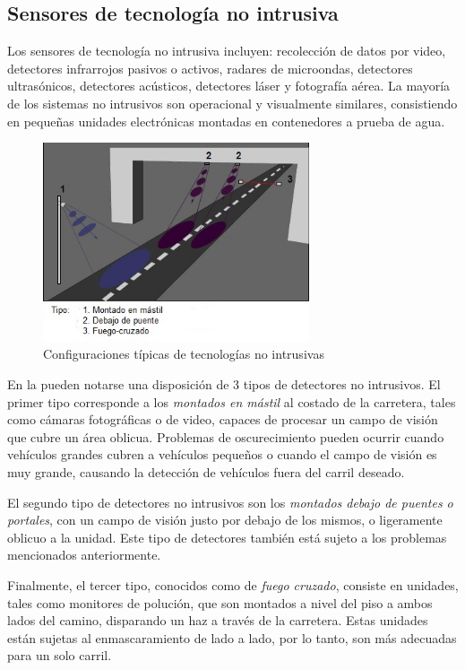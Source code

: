 \subsection{Sensores de tecnología no intrusiva}

Los sensores de tecnología no intrusiva incluyen:  recolección de datos por video, detectores infrarrojos pasivos o activos, radares de microondas, detectores ultrasónicos, detectores acústicos, detectores láser y fotografía aérea. La mayoría de los sistemas no intrusivos son operacional y visualmente similares, consistiendo en pequeñas unidades electrónicas montadas en contenedores a prueba de agua.

\begin{figure}[h]
	\centering
	\includegraphics[width=0.7\textwidth]{capitulos/3/figuras/figura3.jpg}
	\caption{\label{fig:noIntrusica}  Configuraciones típicas de tecnologías no intrusivas}	
\end{figure}

En la  pueden notarse una disposición de 3 tipos de detectores no intrusivos. El primer tipo corresponde a los \emph{montados en mástil} al costado de la carretera, tales como cámaras fotográficas o de video, capaces de procesar un campo de visión que cubre un área oblicua.  Problemas de oscurecimiento pueden ocurrir cuando vehículos grandes cubren a vehículos pequeños o cuando el campo de visión es muy grande, causando la detección de vehículos fuera del carril deseado.

El segundo tipo de detectores no intrusivos son los \emph{montados debajo de puentes o portales}, con un campo de visión justo por debajo de los mismos, o ligeramente oblicuo a la unidad. Este tipo de detectores también está sujeto a los problemas mencionados anteriormente.

Finalmente, el tercer tipo, conocidos como de \emph{fuego cruzado}, consiste en unidades, tales como monitores de polución, que son montados a nivel del piso a ambos lados del camino, disparando un haz a través de la carretera. Estas unidades están sujetas al enmascaramiento de lado a lado, por lo tanto, son más adecuadas para un solo carril.


